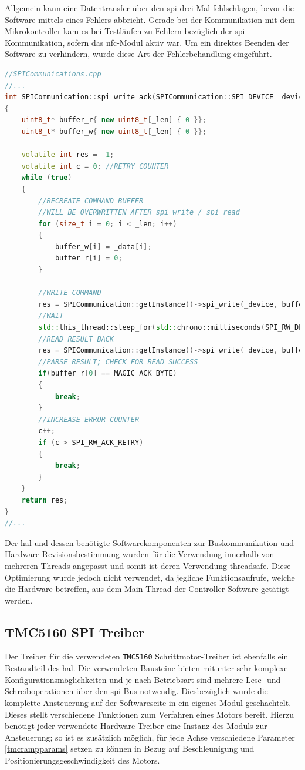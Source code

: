 Allgemein kann eine Datentransfer über den \gls{spi} drei Mal
fehlschlagen, bevor die Software mittels eines Fehlers abbricht. Gerade
bei der Kommunikation mit dem Mikrokontroller kam es bei Testläufen zu
Fehlern bezüglich der \gls{spi} Kommunikation, sofern das
\gls{nfc}-Modul aktiv war. Um ein direktes Beenden der Software zu
verhindern, wurde diese Art der Fehlerbehandlung eingeführt.

\begin{lstlisting}[language={C++}]
//SPICommunications.cpp
//...
int SPICommunication::spi_write_ack(SPICommunication::SPI_DEVICE _device, uint8_t* _data, int _len)
{
    uint8_t* buffer_r{ new uint8_t[_len] { 0 }};
    uint8_t* buffer_w{ new uint8_t[_len] { 0 }};

    volatile int res = -1;
    volatile int c = 0; //RETRY COUNTER
    while (true)
    {
        //RECREATE COMMAND BUFFER
        //WILL BE OVERWRITTEN AFTER spi_write / spi_read
        for (size_t i = 0; i < _len; i++)
        {
            buffer_w[i] = _data[i];
            buffer_r[i] = 0;
        }
        
        //WRITE COMMAND
        res = SPICommunication::getInstance()->spi_write(_device, buffer_w, _len);
        //WAIT
        std::this_thread::sleep_for(std::chrono::milliseconds(SPI_RW_DELAY));
        //READ RESULT BACK
        res = SPICommunication::getInstance()->spi_write(_device, buffer_r, _len);
        //PARSE RESULT; CHECK FOR READ SUCCESS
        if(buffer_r[0] == MAGIC_ACK_BYTE)
        {
            break;
        }
        //INCREASE ERROR COUNTER
        c++;
        if (c > SPI_RW_ACK_RETRY)
        {
            break;
        }
    }
    return res;
}
//...
\end{lstlisting}

Der \gls{hal} und dessen benötigte Softwarekomponenten zur
Buskommunikation und Hardware-Revisionsbestimmung wurden für die
Verwendung innerhalb von mehreren Threads angepasst und somit ist deren
Verwendung threadsafe. Diese Optimierung wurde jedoch nicht verwendet,
da jegliche Funktionsaufrufe, welche die Hardware betreffen, aus dem
Main Thread der Controller-Software getätigt werden.

\hypertarget{tmc5160-spi-treiber}{%
\subsection{TMC5160 SPI Treiber}\label{tmc5160-spi-treiber}}

Der Treiber für die verwendeten \passthrough{\lstinline!TMC5160!}
Schrittmotor-Treiber ist ebenfalls ein Bestandteil des \gls{hal}. Die
verwendeten Bausteine bieten mitunter sehr komplexe
Konfigurationsmöglichkeiten und je nach Betriebsart sind mehrere Lese-
und Schreiboperationen über den \gls{spi} Bus notwendig. Diesbezüglich
wurde die komplette Ansteuerung auf der Softwareseite in ein eigenes
Modul geschachtelt. Dieses stellt verschiedene Funktionen zum Verfahren
eines Motors bereit. Hierzu benötigt jeder verwendete Hardware-Treiber
eine Instanz des Moduls zur Ansteuerung; so ist es zusätzlich möglich,
für jede Achse verschiedene Parameter \ref{tmcrampparams} setzen zu
können in Bezug auf Beschleunigung und Positionierungsgeschwindigkeit
des Motors.

